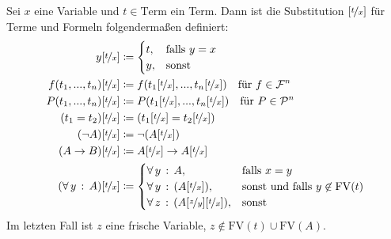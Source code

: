 \documentclass{cheat-sheet}
\newcommand{\Term}{\mathrm{Term}} %
\newcommand{\FV}{\mathrm{FV}} %
\newcommand{\subst}[2]{\nicefrac{#1}{#2}} %
\begin{document}
\begin{prop}
  \begin{minipage}{0.72 \linewidth}
    \begin{itemize}
    \end{itemize}
  \end{minipage}
\end{prop}

\begin{defn}
  Sei $x$ eine Variable und $t \in \Term$ ein Term. Dann ist die Substitution $[\subst{t}{x}]$ für Terme und Formeln folgendermaßen definiert:
  \begin{alignat*}{2}
    y[\subst{t}{x}] & \coloneqq \begin{cases}
      t, & \text{falls } y = x \\
      y, & \text{sonst}
    \end{cases} \\
    f(t_1, ..., t_n)[\subst{t}{x}] & \coloneqq f(t_1[\subst{t}{x}], ..., t_n[\subst{t}{x}]) \quad \text{für $f \in \mathcal{F}^n$} \\
    P(t_1, ..., t_n)[\subst{t}{x}] & \coloneqq P(t_1[\subst{t}{x}], ..., t_n[\subst{t}{x}]) \quad \text{für $P \in \mathcal{P}^n$} \\
    (t_1 = t_2)[\subst{t}{x}] & \coloneqq (t_1[\subst{t}{x}] = t_2[\subst{t}{x}]) \\
    (\neg A)[\subst{t}{x}] & \coloneqq \neg (A[\subst{t}{x}]) \\
    (A \to B)[\subst{t}{x}] & \coloneqq A[\subst{t}{x}] \to A[\subst{t}{x}] \\
    (\fa{y} A)[\subst{t}{x}] & \coloneqq \begin{cases}
      \fa{y} A, & \text{falls $x = y$} \\
      \fa{y} (A[\subst{t}{x}]), & \text{sonst und falls $y \not\in \FV(t)$} \\
      \fa{z} (A[\subst{z}{y}][\subst{t}{x}]), & \text{sonst}
    \end{cases}
  \end{alignat*}
  Im letzten Fall ist $z$ eine frische Variable, \dh{} $z \not\in \FV(t) \cup \FV(A)$.
\end{defn}

\end{document}
